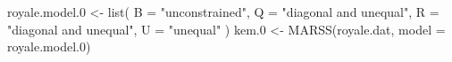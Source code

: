 \begin{Schunk}
\begin{Sinput}
 royale.model.0 <- list(
   B = "unconstrained", Q = "diagonal and unequal",
   R = "diagonal and unequal", U = "unequal"
 )
 kem.0 <- MARSS(royale.dat, model = royale.model.0)
\end{Sinput}
\end{Schunk}
